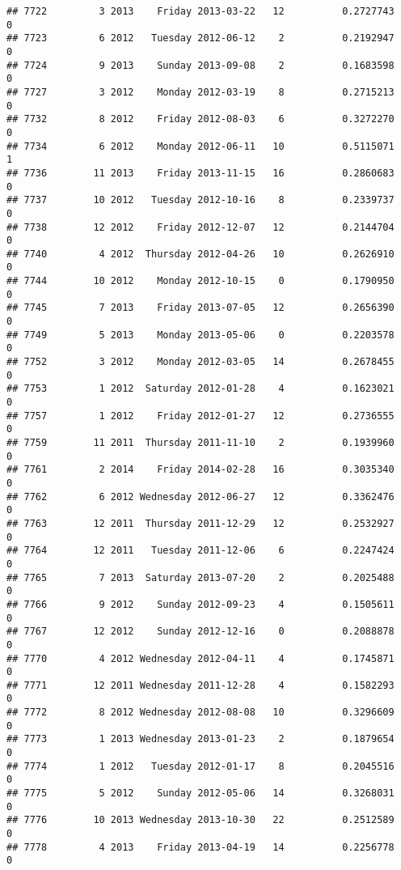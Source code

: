 \documentclass[
]{article}
\begin{document}
\begin{verbatim}
## 7722         3 2013    Friday 2013-03-22   12          0.2727743             0
## 7723         6 2012   Tuesday 2012-06-12    2          0.2192947             0
## 7724         9 2013    Sunday 2013-09-08    2          0.1683598             0
## 7727         3 2012    Monday 2012-03-19    8          0.2715213             0
## 7732         8 2012    Friday 2012-08-03    6          0.3272270             0
## 7734         6 2012    Monday 2012-06-11   10          0.5115071             1
## 7736        11 2013    Friday 2013-11-15   16          0.2860683             0
## 7737        10 2012   Tuesday 2012-10-16    8          0.2339737             0
## 7738        12 2012    Friday 2012-12-07   12          0.2144704             0
## 7740         4 2012  Thursday 2012-04-26   10          0.2626910             0
## 7744        10 2012    Monday 2012-10-15    0          0.1790950             0
## 7745         7 2013    Friday 2013-07-05   12          0.2656390             0
## 7749         5 2013    Monday 2013-05-06    0          0.2203578             0
## 7752         3 2012    Monday 2012-03-05   14          0.2678455             0
## 7753         1 2012  Saturday 2012-01-28    4          0.1623021             0
## 7757         1 2012    Friday 2012-01-27   12          0.2736555             0
## 7759        11 2011  Thursday 2011-11-10    2          0.1939960             0
## 7761         2 2014    Friday 2014-02-28   16          0.3035340             0
## 7762         6 2012 Wednesday 2012-06-27   12          0.3362476             0
## 7763        12 2011  Thursday 2011-12-29   12          0.2532927             0
## 7764        12 2011   Tuesday 2011-12-06    6          0.2247424             0
## 7765         7 2013  Saturday 2013-07-20    2          0.2025488             0
## 7766         9 2012    Sunday 2012-09-23    4          0.1505611             0
## 7767        12 2012    Sunday 2012-12-16    0          0.2088878             0
## 7770         4 2012 Wednesday 2012-04-11    4          0.1745871             0
## 7771        12 2011 Wednesday 2011-12-28    4          0.1582293             0
## 7772         8 2012 Wednesday 2012-08-08   10          0.3296609             0
## 7773         1 2013 Wednesday 2013-01-23    2          0.1879654             0
## 7774         1 2012   Tuesday 2012-01-17    8          0.2045516             0
## 7775         5 2012    Sunday 2012-05-06   14          0.3268031             0
## 7776        10 2013 Wednesday 2013-10-30   22          0.2512589             0
## 7778         4 2013    Friday 2013-04-19   14          0.2256778             0

\end{verbatim}
\end{document}
